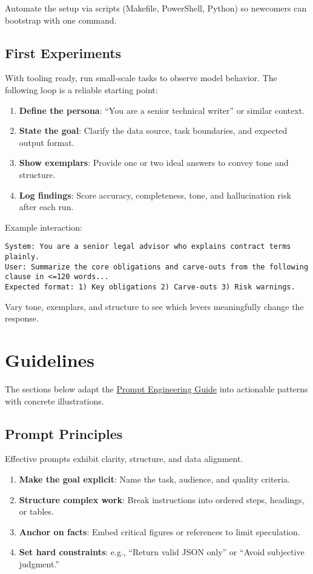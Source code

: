 ﻿\documentclass[12pt]{article}
\begin{document}
Automate the setup via scripts (Makefile, PowerShell, Python) so newcomers can bootstrap with one command.

\subsection{First Experiments}
With tooling ready, run small-scale tasks to observe model behavior. The following loop is a reliable starting point:

\begin{enumerate}[leftmargin=*,itemsep=0.5em]
  \item \textbf{Define the persona}: ``You are a senior technical writer'' or similar context.
  \item \textbf{State the goal}: Clarify the data source, task boundaries, and expected output format.
  \item \textbf{Show exemplars}: Provide one or two ideal answers to convey tone and structure.
  \item \textbf{Log findings}: Score accuracy, completeness, tone, and hallucination risk after each run.
\end{enumerate}

Example interaction:
\begin{verbatim}
System: You are a senior legal advisor who explains contract terms plainly.
User: Summarize the core obligations and carve-outs from the following clause in <=120 words...
Expected format: 1) Key obligations 2) Carve-outs 3) Risk warnings.
\end{verbatim}

Vary tone, exemplars, and structure to see which levers meaningfully change the response.

\section{Guidelines}
The sections below adapt the \href{https://prompt-engineering.xiniushu.com/}{Prompt Engineering Guide} into actionable patterns with concrete illustrations.

\subsection{Prompt Principles}
Effective prompts exhibit clarity, structure, and data alignment.

\begin{enumerate}[leftmargin=*,itemsep=0.4em]
  \item \textbf{Make the goal explicit}: Name the task, audience, and quality criteria.
  \item \textbf{Structure complex work}: Break instructions into ordered steps, headings, or tables.
  \item \textbf{Anchor on facts}: Embed critical figures or references to limit speculation.
  \item \textbf{Set hard constraints}: e.g., ``Return valid JSON only'' or ``Avoid subjective judgment.''
\end{enumerate}
\end{document}
